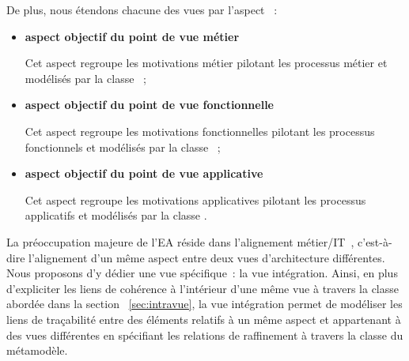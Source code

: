 De plus, nous étendons chacune des vues par l'aspect ~: 
\begin{itemize}

    \item \textbf{aspect objectif du point de vue métier}

Cet aspect regroupe les motivations métier pilotant les processus métier et modélisés
par la classe  ~;

    \item \textbf{aspect objectif du point de vue fonctionnelle}

Cet aspect regroupe les motivations fonctionnelles pilotant les processus fonctionnels
et modélisés par la classe  ~;

    \item \textbf{aspect objectif du point de vue applicative}

Cet aspect regroupe les motivations applicatives pilotant les processus applicatifs
et modélisés par la classe  .

\end{itemize}


La préoccupation majeure de l'EA réside dans l'alignement métier/IT~\cite{kaisler_enterprise_2005},
c'est-à-dire l'alignement d'un même aspect entre deux vues d'architecture différentes.
Nous proposons d'y dédier une vue spécifique~: la vue intégration.
Ainsi, en plus d'expliciter les liens de cohérence à l'intérieur d'une même vue
à travers la classe  abordée dans la section
~\ref{sec:intravue}, la vue intégration permet de modéliser les liens de traçabilité
entre des éléments relatifs à un même aspect et appartenant à des vues différentes en spécifiant les relations de
raffinement à travers la classe  du métamodèle.
 
